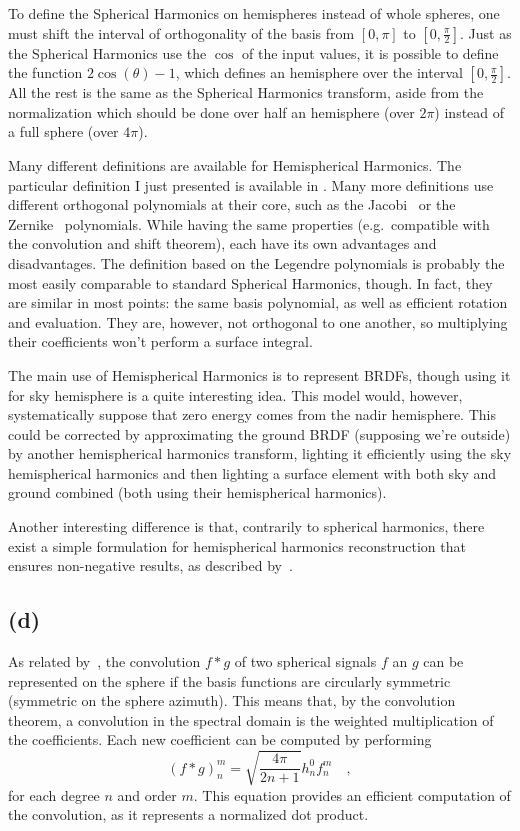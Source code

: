 \documentclass{report}
\begin{document}
To define the Spherical Harmonics on hemispheres instead of whole spheres, one must shift the interval of orthogonality of the basis from $\left[ 0, \pi \right]$ to $\left[ 0, \frac{\pi}{2} \right]$. Just as the Spherical Harmonics use the $\cos$ of the input values, it is possible to define the function $2\cos(\theta)-1$, which defines an hemisphere over the interval $\left[ 0, \frac{\pi}{2} \right]$. All the rest is the same as the Spherical Harmonics transform, aside from the normalization which should be done over half an hemisphere (over $2\pi$) instead of a full sphere (over $4\pi$).

Many different definitions are available for Hemispherical Harmonics. The particular definition I just presented is available in \cite{Gautron2004}. Many more definitions use different orthogonal polynomials at their core, such as the Jacobi~\cite{Makhotkin1996} or the Zernike~\cite{Koenderink1996} polynomials. While having the same properties (e.g.\ compatible with the convolution and shift theorem), each have its own advantages and disadvantages. The definition based on the Legendre polynomials is probably the most easily comparable to standard Spherical Harmonics, though. In fact, they are similar in most points: the same basis polynomial, as well as efficient rotation and evaluation. They are, however, not orthogonal to one another, so multiplying their coefficients won't perform a surface integral.

The main use of Hemispherical Harmonics is to represent BRDFs, though using it for sky hemisphere is a quite interesting idea. This model would, however, systematically suppose that zero energy comes from the nadir hemisphere. This could be corrected by approximating the ground BRDF (supposing we're outside) by another hemispherical harmonics transform, lighting it efficiently using the sky hemispherical harmonics and then lighting a surface element with both sky and ground combined (both using their hemispherical harmonics).

Another interesting difference is that, contrarily to spherical harmonics, there exist a simple formulation for hemispherical harmonics reconstruction that ensures non-negative results, as described by~\cite{Elhabian2011}.

\subsection{(d)}
As related by~\cite{Sloan2008,jarosz-08}, the convolution $f*g$ of two spherical signals $f$ an $g$ can be represented on the sphere if the basis functions are circularly symmetric (symmetric on the sphere azimuth). This means that, by the convolution theorem, a convolution in the spectral domain is the weighted multiplication of the coefficients. Each new coefficient can be computed by performing
\begin{equation}
\left(f * g\right)_n^m = \sqrt{\frac{4\pi}{2n+1}} h_n^0 f_n^m
\quad,
\end{equation}
for each degree $n$ and order $m$. This equation provides an efficient computation of the convolution, as it represents a normalized dot product.
\end{document}
